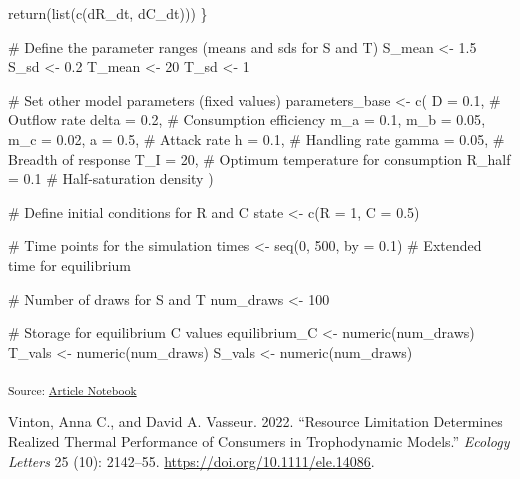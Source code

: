 \documentclass[
  letterpaper,
  DIV=11,
  numbers=noendperiod]{scrartcl}
\newenvironment{Shaded}{\begin{snugshade}}{\end{snugshade}}
\newcommand{\AttributeTok}[1]{\textcolor[rgb]{0.40,0.45,0.13}{#1}}
\newcommand{\CommentTok}[1]{\textcolor[rgb]{0.37,0.37,0.37}{#1}}
\newcommand{\DecValTok}[1]{\textcolor[rgb]{0.68,0.00,0.00}{#1}}
\newcommand{\FloatTok}[1]{\textcolor[rgb]{0.68,0.00,0.00}{#1}}
\newcommand{\FunctionTok}[1]{\textcolor[rgb]{0.28,0.35,0.67}{#1}}
\newcommand{\NormalTok}[1]{\textcolor[rgb]{0.00,0.23,0.31}{#1}}
\newcommand{\OtherTok}[1]{\textcolor[rgb]{0.00,0.23,0.31}{#1}}
\newlength{\cslhangindent}
\newenvironment{CSLReferences}[2] %
 {\begin{list}{}{%
  \setlength{\itemindent}{0pt}
  \setlength{\leftmargin}{0pt}
  \setlength{\parsep}{0pt}
  \ifodd #1
   \setlength{\leftmargin}{\cslhangindent}
   \setlength{\itemindent}{-1\cslhangindent}
  \fi
  \setlength{\itemsep}{#2\baselineskip}}}
 {\end{list}}
\begin{document}
\begin{Shaded}
\begin{Highlighting}[]
    \FunctionTok{return}\NormalTok{(}\FunctionTok{list}\NormalTok{(}\FunctionTok{c}\NormalTok{(dR\_dt, dC\_dt)))}
\NormalTok{\}}

\CommentTok{\# Define the parameter ranges (means and sds for S and T)}
\NormalTok{S\_mean }\OtherTok{\textless{}{-}} \FloatTok{1.5}
\NormalTok{S\_sd }\OtherTok{\textless{}{-}} \FloatTok{0.2}
\NormalTok{T\_mean }\OtherTok{\textless{}{-}} \DecValTok{20}
\NormalTok{T\_sd }\OtherTok{\textless{}{-}} \DecValTok{1}

\CommentTok{\# Set other model parameters (fixed values)}
\NormalTok{parameters\_base }\OtherTok{\textless{}{-}} \FunctionTok{c}\NormalTok{(}
    \AttributeTok{D =} \FloatTok{0.1}\NormalTok{, }\CommentTok{\# Outflow rate}
    \AttributeTok{delta =} \FloatTok{0.2}\NormalTok{, }\CommentTok{\# Consumption efficiency}
    \AttributeTok{m\_a =} \FloatTok{0.1}\NormalTok{,}
    \AttributeTok{m\_b =} \FloatTok{0.05}\NormalTok{,}
    \AttributeTok{m\_c =} \FloatTok{0.02}\NormalTok{,}
    \AttributeTok{a =} \FloatTok{0.5}\NormalTok{, }\CommentTok{\# Attack rate}
    \AttributeTok{h =} \FloatTok{0.1}\NormalTok{, }\CommentTok{\# Handling rate}
    \AttributeTok{gamma =} \FloatTok{0.05}\NormalTok{, }\CommentTok{\# Breadth of response}
    \AttributeTok{T\_I =} \DecValTok{20}\NormalTok{, }\CommentTok{\# Optimum temperature for consumption}
    \AttributeTok{R\_half =} \FloatTok{0.1} \CommentTok{\# Half{-}saturation density}
\NormalTok{)}

\CommentTok{\# Define initial conditions for R and C}
\NormalTok{state }\OtherTok{\textless{}{-}} \FunctionTok{c}\NormalTok{(}\AttributeTok{R =} \DecValTok{1}\NormalTok{, }\AttributeTok{C =} \FloatTok{0.5}\NormalTok{)}

\CommentTok{\# Time points for the simulation}
\NormalTok{times }\OtherTok{\textless{}{-}} \FunctionTok{seq}\NormalTok{(}\DecValTok{0}\NormalTok{, }\DecValTok{500}\NormalTok{, }\AttributeTok{by =} \FloatTok{0.1}\NormalTok{) }\CommentTok{\# Extended time for equilibrium}

\CommentTok{\# Number of draws for S and T}
\NormalTok{num\_draws }\OtherTok{\textless{}{-}} \DecValTok{100}

\CommentTok{\# Storage for equilibrium C values}
\NormalTok{equilibrium\_C }\OtherTok{\textless{}{-}} \FunctionTok{numeric}\NormalTok{(num\_draws)}
\NormalTok{T\_vals }\OtherTok{\textless{}{-}} \FunctionTok{numeric}\NormalTok{(num\_draws)}
\NormalTok{S\_vals }\OtherTok{\textless{}{-}} \FunctionTok{numeric}\NormalTok{(num\_draws)}
\end{Highlighting}
\end{Shaded}

\textsubscript{Source:
\href{https://colebrookson.github.io/theRmal-landscape/index.qmd.html}{Article
Notebook}}

\label{refs}
\begin{CSLReferences}{1}{0}
Vinton, Anna C., and David A. Vasseur. 2022. {``Resource Limitation
Determines Realized Thermal Performance of Consumers in Trophodynamic
Models.''} \emph{Ecology Letters} 25 (10): 2142--55.
\url{https://doi.org/10.1111/ele.14086}.

\end{CSLReferences}
\end{document}
